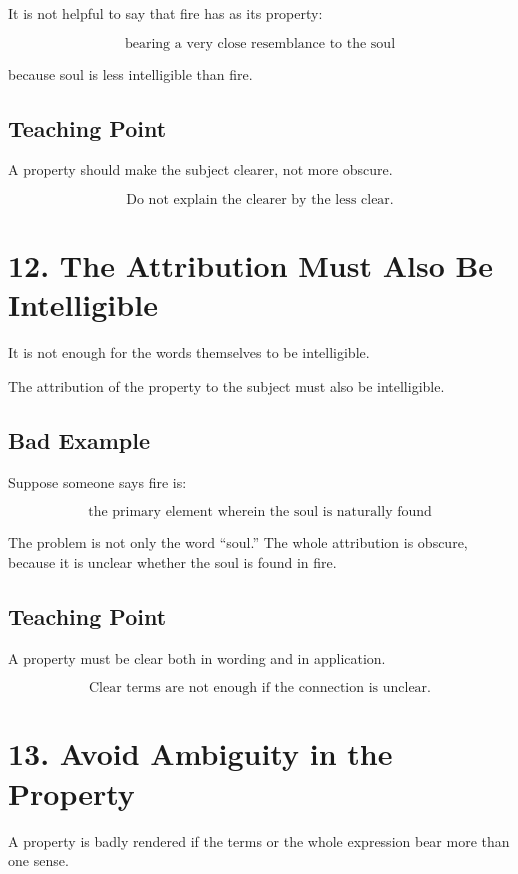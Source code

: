 \documentclass[12pt]{article}
\begin{document}
It is not helpful to say that fire has as its property:

\[
\text{bearing a very close resemblance to the soul}
\]

because soul is less intelligible than fire.

\subsection*{Teaching Point}

A property should make the subject clearer, not more obscure.

\[
\boxed{
\text{Do not explain the clearer by the less clear.}
}
\]

\section*{12. The Attribution Must Also Be Intelligible}

It is not enough for the words themselves to be intelligible.

The attribution of the property to the subject must also be intelligible.

\subsection*{Bad Example}

Suppose someone says fire is:

\[
\text{the primary element wherein the soul is naturally found}
\]

The problem is not only the word ``soul.'' The whole attribution is obscure,
because it is unclear whether the soul is found in fire.

\subsection*{Teaching Point}

A property must be clear both in wording and in application.

\[
\boxed{
\text{Clear terms are not enough if the connection is unclear.}
}
\]

\section*{13. Avoid Ambiguity in the Property}

A property is badly rendered if the terms or the whole expression bear more than
one sense.
\end{document}
